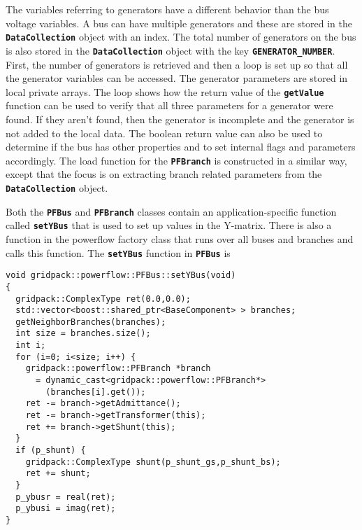 The variables referring to generators have a different behavior than the bus
voltage variables. A bus can have multiple generators and these are stored in
the \texttt{\textbf{DataCollection}} object with an index. The total number of
generators on the bus is also stored in the \texttt{\textbf{DataCollection}}
object with the key \texttt{\textbf{GENERATOR\_NUMBER}}. First, the number of generators is retrieved and then a loop is set up so that all the generator variables can be accessed. The generator parameters are stored in local private arrays. The loop shows how the return value of the \texttt{\textbf{getValue}} function can be used to verify that all three parameters for a generator were found. If they aren't found, then the generator is incomplete and the generator is not added to the local data. The boolean return value can also be used to determine if the bus has other properties and to set internal flags and parameters accordingly. The load function for the \texttt{\textbf{PFBranch}} is constructed in a similar way, except that the focus is on extracting branch related parameters from the \texttt{\textbf{DataCollection}} object.

Both the \texttt{\textbf{PFBus}} and \texttt{\textbf{PFBranch}} classes contain an application-specific function called \texttt{\textbf{setYBus}} that is used to set up values in the Y-matrix. There is also a function in the powerflow factory class that runs over all buses and branches and calls this function. The \texttt{\textbf{setYBus}} function in \texttt{\textbf{PFBus}} is

{
\color{red}
\begin{Verbatim}[fontseries=b]
void gridpack::powerflow::PFBus::setYBus(void)
{
  gridpack::ComplexType ret(0.0,0.0);
  std::vector<boost::shared_ptr<BaseComponent> > branches;
  getNeighborBranches(branches);
  int size = branches.size();
  int i;
  for (i=0; i<size; i++) {
    gridpack::powerflow::PFBranch *branch
      = dynamic_cast<gridpack::powerflow::PFBranch*>
        (branches[i].get());
    ret -= branch->getAdmittance();
    ret -= branch->getTransformer(this);
    ret += branch->getShunt(this);
  }
  if (p_shunt) {
    gridpack::ComplexType shunt(p_shunt_gs,p_shunt_bs);
    ret += shunt;
  }
  p_ybusr = real(ret);
  p_ybusi = imag(ret);
}
\end{Verbatim}
}

